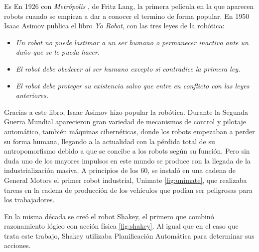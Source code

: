 Es En 1926  con \textit{Metrópolis} , de Fritz Lang, la primera película en la que aparecen robots cuando se empieza a dar a conocer el termino de forma popular.
En 1950 Isaac Asimov publica el libro \textit{Yo Robot}, con las tres leyes de la robótica:
\begin{itemize}
\item \textit{Un robot no puede lastimar a un ser humano o permanecer inactivo ante un daño que se le pueda hacer.}

\item \textit{El robot debe obedecer al ser humano excepto si contradice la primera ley.}

\item \textit{El robot debe proteger su existencia salvo que entre en conflicto con las leyes anteriores.}

\end{itemize}

Gracias a este libro, Isaac Asimov hizo popular la robótica.
Durante la Segunda Guerra Mundial aparecieron gran variedad de
mecanismos de control y pilotaje automático, también máquinas cibernéticas, donde los robots empezaban a perder su forma humana, llegando a la actualidad con la pérdida total de su antropomorfismo debido a que se concibe a los robots según su función.
Pero sin duda uno de los mayores impulsos en este mundo se produce con la llegada de la industrialización masiva. A principios de los 60, se instaló en una cadena de General Motors el primer robot industrial, Unimate \ref{fig:unimate}, que realizaba tareas en la cadena de producción de los vehículos que podían ser peligrosas para los trabajadores.

En la misma década se creó el robot Shakey, el primero que combinó razonamiento lógico con acción física \ref{fig:shakey}. Al igual que en el caso que trata este trabajo, Shakey utilizaba Planificación Automática para determinar sus acciones.

